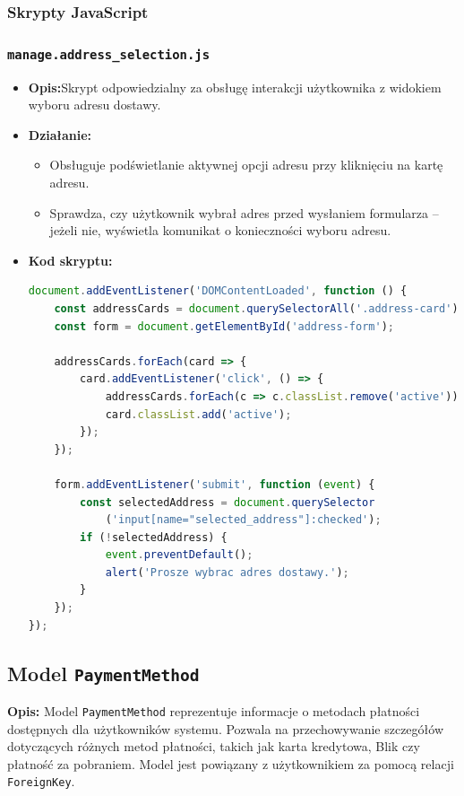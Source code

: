 \documentclass[12pt,a4paper,oneside]{article}
\theoremstyle{definition}
\numberwithin{equation}{section}
\begin{document}
\subsubsection{Skrypty JavaScript}

\subsubsection*{\texttt{manage.address\_selection.js}}
\begin{itemize}
    \item \textbf{Opis:}Skrypt odpowiedzialny za obsługę interakcji użytkownika z widokiem wyboru adresu dostawy.
    \item \textbf{Działanie:}
        \begin{itemize}
            \item Obsługuje podświetlanie aktywnej opcji adresu przy kliknięciu na kartę adresu.
            \item Sprawdza, czy użytkownik wybrał adres przed wysłaniem formularza – jeżeli nie, wyświetla komunikat o konieczności wyboru adresu.
        \end{itemize}
    \item \textbf{Kod skryptu:}
\begin{lstlisting}[language=JavaScript, caption=Skrypt manage.address\_choice.js]
document.addEventListener('DOMContentLoaded', function () {
    const addressCards = document.querySelectorAll('.address-card');
    const form = document.getElementById('address-form');

    addressCards.forEach(card => {
        card.addEventListener('click', () => {
            addressCards.forEach(c => c.classList.remove('active'));
            card.classList.add('active');
        });
    });

    form.addEventListener('submit', function (event) {
        const selectedAddress = document.querySelector
            ('input[name="selected_address"]:checked');
        if (!selectedAddress) {
            event.preventDefault();
            alert('Prosze wybrac adres dostawy.');
        }
    });
});
\end{lstlisting}
\end{itemize}


% 
% 
\clearpage
\subsection{Model \texttt{PaymentMethod}}

\textbf{Opis:}  
Model \texttt{PaymentMethod} reprezentuje informacje o metodach płatności dostępnych dla użytkowników systemu. Pozwala na przechowywanie szczegółów dotyczących różnych metod płatności, takich jak karta kredytowa, Blik czy płatność za pobraniem. Model jest powiązany z użytkownikiem za pomocą relacji \texttt{ForeignKey}.
\end{document}
